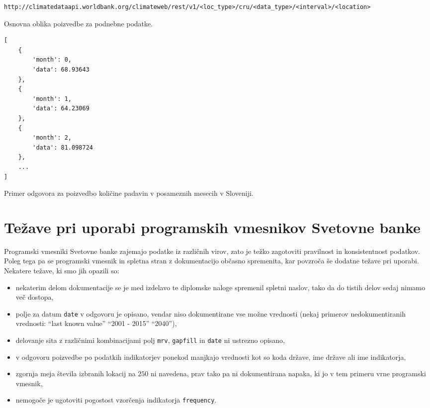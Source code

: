 \begin{snippet}
\begin{center}
\begin{lstlisting}
http://climatedataapi.worldbank.org/climateweb/rest/v1/<loc_type>/cru/<data_type>/<interval>/<location>
\end{lstlisting}
\end{center}
\caption{Osnovna oblika poizvedbe za podnebne podatke.}
\label{climate_dataset_request}
\end{snippet} 


\begin{snippet}
\begin{center}
\begin{lstlisting}
[
    {
        'month': 0,
        'data': 68.93643
    },
    {
        'month': 1,
        'data': 64.23069
    },
    {
        'month': 2,
        'data': 81.098724
    },
    ...
]
\end{lstlisting}
\end{center}
\caption{Primer odgovora za poizvedbo količine padavin v posameznih mesecih v 
  Sloveniji.}
\label{climate_dataset_response}
\end{snippet} 






\section{Težave pri uporabi programskih vmesnikov Svetovne banke}
\label{api_gotchas}


Programski vmesniki Svetovne banke zajemajo podatke iz različnih virov, zato je
težko zagotoviti pravilnost in konsistentnost podatkov. Poleg tega pa se 
programski vmesnik in spletna stran z dokumentacijo občasno spremenita, kar
povzroča še dodatne težave pri uporabi. Nekatere težave, ki smo jih opazili
so:
\begin{itemize}  
\item nekaterim delom dokumentacije se je med izdelavo te diplomske naloge
  spremenil spletni naslov, tako da do tistih delov sedaj nimamo več dostopa,
\item polje za datum \verb|date| v odgovoru je opisano, vendar niso dokumentirane vse možne vrednosti
    (nekaj primerov nedokumentiranih vrednosti:
    ``last known value'' ``2001 - 2015'' ``2040''),
\item delovanje sita z različnimi kombinacijami polj \verb|mrv|, \verb|gapfill|
  in \verb|date| ni ustrezno opisano,
\item v odgovoru poizvedbe po podatkih indikatorjev ponekod manjkajo vrednosti
  kot so koda države, ime države ali ime indikatorja,
\item zgornja meja števila izbranih lokacij na $250$ ni navedena, prav tako pa ni
  dokumentirana napaka, ki jo v tem primeru vrne programski vmesnik,
\item nemogoče je ugotoviti pogostost vzorčenja indikatorja \verb|frequency|.
\end{itemize}  







